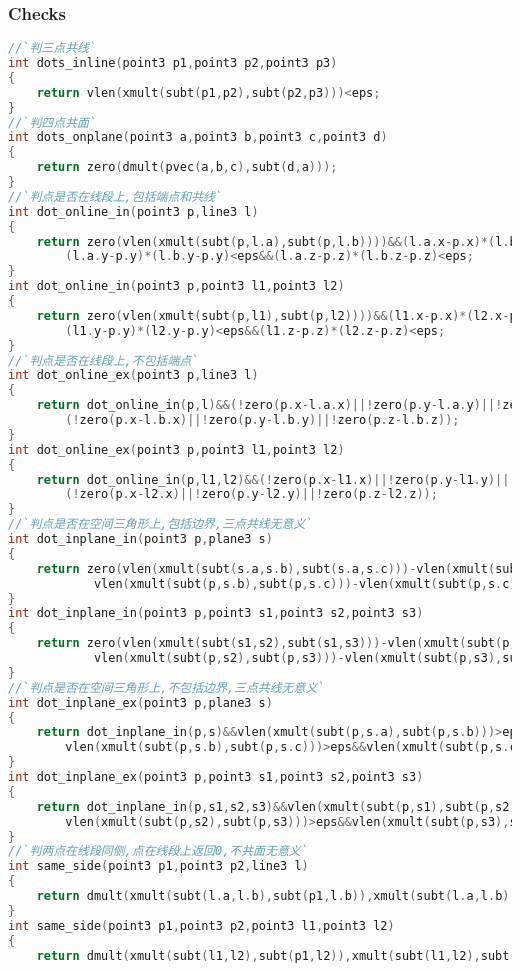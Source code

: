 \subsubsection{Checks}
\begin{lstlisting}[language=C++]
//`判三点共线`
int dots_inline(point3 p1,point3 p2,point3 p3)
{
    return vlen(xmult(subt(p1,p2),subt(p2,p3)))<eps;
}
//`判四点共面`
int dots_onplane(point3 a,point3 b,point3 c,point3 d)
{
    return zero(dmult(pvec(a,b,c),subt(d,a)));
}
//`判点是否在线段上,包括端点和共线`
int dot_online_in(point3 p,line3 l)
{
    return zero(vlen(xmult(subt(p,l.a),subt(p,l.b))))&&(l.a.x-p.x)*(l.b.x-p.x)<eps&&
        (l.a.y-p.y)*(l.b.y-p.y)<eps&&(l.a.z-p.z)*(l.b.z-p.z)<eps;
}
int dot_online_in(point3 p,point3 l1,point3 l2)
{
    return zero(vlen(xmult(subt(p,l1),subt(p,l2))))&&(l1.x-p.x)*(l2.x-p.x)<eps&&
        (l1.y-p.y)*(l2.y-p.y)<eps&&(l1.z-p.z)*(l2.z-p.z)<eps;
}
//`判点是否在线段上,不包括端点`
int dot_online_ex(point3 p,line3 l)
{
    return dot_online_in(p,l)&&(!zero(p.x-l.a.x)||!zero(p.y-l.a.y)||!zero(p.z-l.a.z))&&
        (!zero(p.x-l.b.x)||!zero(p.y-l.b.y)||!zero(p.z-l.b.z));
}
int dot_online_ex(point3 p,point3 l1,point3 l2)
{
    return dot_online_in(p,l1,l2)&&(!zero(p.x-l1.x)||!zero(p.y-l1.y)||!zero(p.z-l1.z))&&
        (!zero(p.x-l2.x)||!zero(p.y-l2.y)||!zero(p.z-l2.z));
}
//`判点是否在空间三角形上,包括边界,三点共线无意义`
int dot_inplane_in(point3 p,plane3 s)
{
    return zero(vlen(xmult(subt(s.a,s.b),subt(s.a,s.c)))-vlen(xmult(subt(p,s.a),subt(p,s.b)))-
            vlen(xmult(subt(p,s.b),subt(p,s.c)))-vlen(xmult(subt(p,s.c),subt(p,s.a))));
}
int dot_inplane_in(point3 p,point3 s1,point3 s2,point3 s3)
{
    return zero(vlen(xmult(subt(s1,s2),subt(s1,s3)))-vlen(xmult(subt(p,s1),subt(p,s2)))-
            vlen(xmult(subt(p,s2),subt(p,s3)))-vlen(xmult(subt(p,s3),subt(p,s1))));
}
//`判点是否在空间三角形上,不包括边界,三点共线无意义`
int dot_inplane_ex(point3 p,plane3 s)
{
    return dot_inplane_in(p,s)&&vlen(xmult(subt(p,s.a),subt(p,s.b)))>eps&&
        vlen(xmult(subt(p,s.b),subt(p,s.c)))>eps&&vlen(xmult(subt(p,s.c),subt(p,s.a)))>eps;
}
int dot_inplane_ex(point3 p,point3 s1,point3 s2,point3 s3)
{
    return dot_inplane_in(p,s1,s2,s3)&&vlen(xmult(subt(p,s1),subt(p,s2)))>eps&&
        vlen(xmult(subt(p,s2),subt(p,s3)))>eps&&vlen(xmult(subt(p,s3),subt(p,s1)))>eps;
}
//`判两点在线段同侧,点在线段上返回0,不共面无意义`
int same_side(point3 p1,point3 p2,line3 l)
{
    return dmult(xmult(subt(l.a,l.b),subt(p1,l.b)),xmult(subt(l.a,l.b),subt(p2,l.b)))>eps;
}
int same_side(point3 p1,point3 p2,point3 l1,point3 l2)
{
    return dmult(xmult(subt(l1,l2),subt(p1,l2)),xmult(subt(l1,l2),subt(p2,l2)))>eps;

\end{lstlisting}

